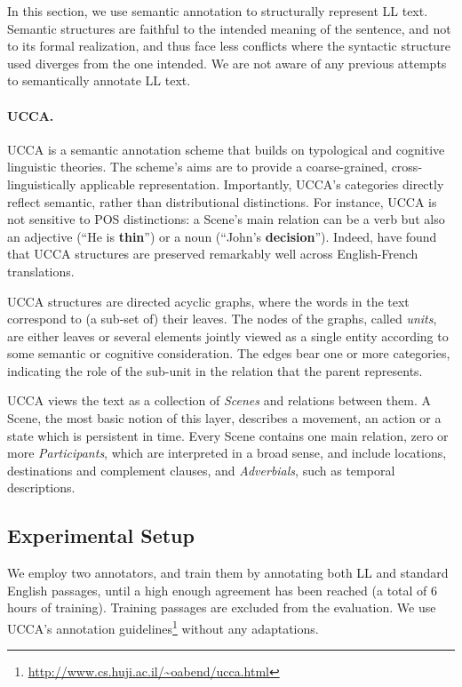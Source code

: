 \documentclass[letterpaper, 11pt]{article}
\begin{document}
%

In this section, we use semantic annotation to structurally
represent LL text. Semantic structures are faithful to the intended
meaning of the sentence, and not to its formal realization, and thus face
less conflicts where the syntactic structure used diverges from
the one intended. We are not aware of any previous attempts to semantically
annotate LL text.

\paragraph{UCCA.}\label{sec:ucca}
UCCA is a semantic annotation scheme that builds on
typological and cognitive linguistic theories.
The scheme's aims are to provide a coarse-grained, cross-linguistically
applicable representation.
Importantly, UCCA's categories directly reflect semantic, rather than
distributional distinctions.
For instance, UCCA is not sensitive to POS distinctions:
a Scene's main relation can be a verb but also an adjective
(``He is {\bf thin}'') or a noun (``John's {\bf decision}'').
Indeed,  have found that UCCA structures are
preserved remarkably well across English-French translations. 

UCCA structures are directed acyclic graphs, where the words in the text 
correspond to (a sub-set of) their leaves.
The nodes of the graphs, called {\it units}, are either leaves or several elements jointly
viewed as a single entity according to some semantic or cognitive consideration.
The edges bear one or more categories, indicating the role of 
the sub-unit in the relation that the parent represents.

UCCA views the text as a collection of {\it Scenes} and relations between them.
A Scene, the most basic notion of this layer, describes a movement, 
an action or a state which is persistent in time.
Every Scene contains one main relation, 
zero or more {\it Participants}, 
which are interpreted in a broad sense, 
and include locations, destinations and complement clauses,
and {\it Adverbials}, such as temporal descriptions.

\subsection{Experimental Setup}
We employ two annotators, and train them by annotating both LL and standard English
passages, until a high enough agreement has been reached (a total of 6 hours of training).
Training passages are excluded from the evaluation.
We use UCCA's annotation guidelines\footnote{\url{http://www.cs.huji.ac.il/~oabend/ucca.html}} without any adaptations.
\end{document}
